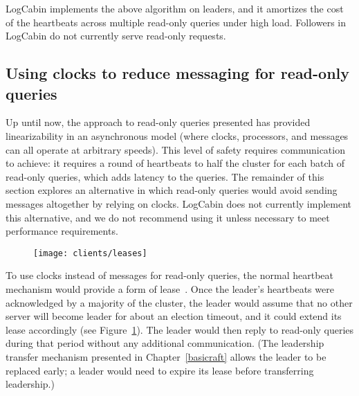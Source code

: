 LogCabin implements the above algorithm on leaders, and it amortizes the
cost of the heartbeats across multiple read-only queries under high
load. Followers in LogCabin do not currently serve read-only requests.

\subsection{Using clocks to reduce messaging for read-only queries}



Up until now, the approach to read-only queries presented has provided
linearizability in an asynchronous model (where clocks, processors, and
messages can all operate at arbitrary speeds). This level of safety
requires communication to achieve: it requires a round of heartbeats to
half the cluster for each batch of read-only queries, which adds
latency to the queries.
The remainder of this section explores an alternative in which read-only
queries would avoid sending messages altogether by relying on clocks.
LogCabin does not currently implement this alternative, and we do not
recommend using it unless necessary to meet performance requirements.

\begin{figure}
\centering
\texttt{[image: clients/leases]}
\label{fig:clients:leases}
\end{figure}

To use clocks instead of messages for read-only queries,
the normal heartbeat mechanism
would provide a form of lease~\cite{Gray:1989}.
Once the
leader's heartbeats were acknowledged by a majority of the cluster, the
leader would assume that no other server will become leader for about an
election timeout, and it could extend its lease accordingly (see
Figure~\ref{fig:clients:leases}). The leader would then reply to
read-only queries during that period without any additional
communication. (The leadership transfer mechanism presented in
Chapter~\ref{basicraft} allows the leader to be replaced early; a leader
would need to expire its lease before transferring leadership.)

